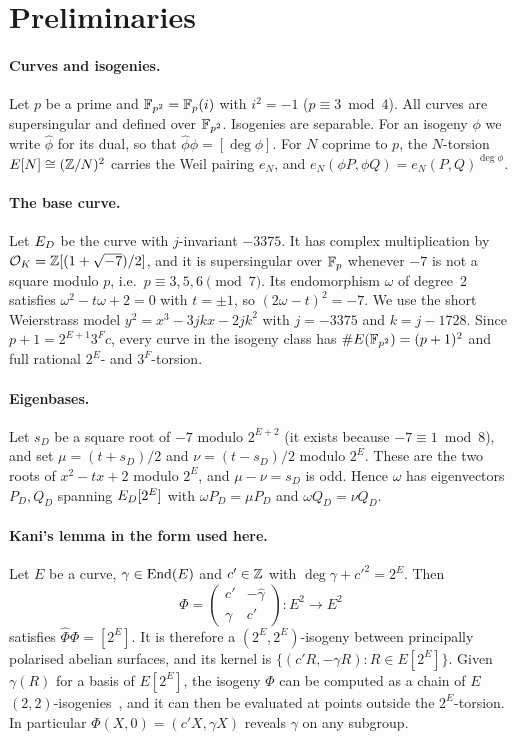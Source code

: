 \section{Preliminaries}\label{sec:prelim}

\paragraph{Curves and isogenies.} Let $p$ be a prime and $\mathbb{F}_{p^2}=\mathbb{F}_p(i)$ with
$i^2=-1$ ($p\equiv3\bmod4$). All curves are supersingular and defined over
$\mathbb{F}_{p^2}$. Isogenies are separable. For an isogeny $\phi$ we write $\hat\phi$
for its dual, so that $\hat\phi\phi=[\deg\phi]$. For $N$ coprime to $p$, the
$N$-torsion $E[N]\cong(\mathbb{Z}/N)^2$ carries the Weil pairing $e_N$, and
$e_N(\phi P,\phi Q)=e_N(P,Q)^{\deg\phi}$.

\paragraph{The base curve.} Let $E_D$ be the curve with $j$-invariant $-3375$.
It has complex multiplication by $\mathcal{O}_K=\mathbb{Z}[(1+\sqrt{-7})/2]$, and it is
supersingular over $\mathbb{F}_p$ whenever $-7$ is not a square modulo $p$, i.e.\
$p\equiv3,5,6\pmod 7$. Its endomorphism $\omega$ of degree~2 satisfies
$\omega^2-t\omega+2=0$ with $t=\pm1$, so $(2\omega-t)^2=-7$. We use the short
Weierstrass model $y^2=x^3-3jkx-2jk^2$ with $j=-3375$ and $k=j-1728$. Since
$p+1=2^{E+1}3^Fc$, every curve in the isogeny class has
$\#E(\mathbb{F}_{p^2})=(p+1)^2$ and full rational $2^E$- and $3^F$-torsion.

\paragraph{Eigenbases.} Let $s_D$ be a square root of $-7$ modulo $2^{E+2}$
(it exists because $-7\equiv1\bmod8$), and set
$\mu=(t+s_D)/2$ and $\nu=(t-s_D)/2$ modulo $2^E$. These are the two roots of
$x^2-tx+2$ modulo $2^E$, and $\mu-\nu=s_D$ is odd. Hence $\omega$ has
eigenvectors $P_D,Q_D$ spanning $E_D[2^E]$ with $\omega P_D=\mu P_D$ and
$\omega Q_D=\nu Q_D$.

\paragraph{Kani's lemma in the form used here.} Let $E$ be a curve, $\gamma\in\operatorname{End}(E)$
and $c'\in\mathbb{Z}$ with $\deg\gamma+c'^2=2^E$. Then
\[
\Phi=\begin{pmatrix} c' & -\hat\gamma\\ \gamma & c'\end{pmatrix}:E^2\to E^2
\]
satisfies $\hat\Phi\Phi=[2^E]$. It is therefore a $(2^E,2^E)$-isogeny between
principally polarised abelian surfaces, and its kernel is
$\{(c'R,-\gamma R):R\in E[2^E]\}$. Given $\gamma(R)$ for a basis of
$E[2^E]$, the isogeny $\Phi$ can be computed as a chain of $E$
$(2,2)$-isogenies~\cite{Kan97,CD23,Rob23}, and it can then be evaluated at
points outside the $2^E$-torsion. In particular $\Phi(X,0)=(c'X,\gamma X)$
reveals $\gamma$ on any subgroup.

